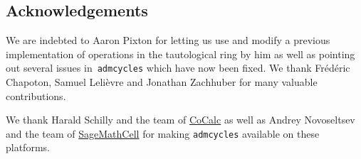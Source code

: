 \documentclass[11pt]{article}
\newcommand{\M}{\ensuremath{\overline{\mathcalorig{M}}}}
\newcommand{\Sage}{SageMath}
\newcommand{\admcycles}{\texttt{admcycles}}
\begin{document}






\subsection*{Acknowledgements}
We are indebted to Aaron Pixton for letting us use and modify a previous implementation of operations in the tautological ring by him as well as pointing out several issues in~\admcycles{} which have now been fixed. We thank Fr\'ed\'eric Chapoton, Samuel Leli\`{e}vre  and Jonathan Zachhuber for many valuable contributions.

We thank Harald Schilly and the team of \href{https://cocalc.com/}{CoCalc} as well as Andrey Novoseltsev and the team of \href{https://sagecell.sagemath.org/}{SageMathCell} for making \admcycles{} available on these platforms.
\end{document}
